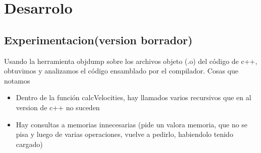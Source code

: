 \section{Desarrolo}%



\subsection{Experimentacion(version borrador)}

Usando la herramienta objdump sobre los archivos objeto (.o) del código de c++, obtuvimos y analizamos el código ensamblado por el compilador.
Cosas que notamos 
\begin{itemize}
	\item Dentro de la función calcVelocities, hay llamados varios recursivos que en al version de c++ no suceden
	\item Hay consultas a memorias innecesarias (pide un valora memoria, que no se pisa y luego de varias operaciones, vuelve a pedirlo, habiendolo tenido cargado)
\end{itemize}
